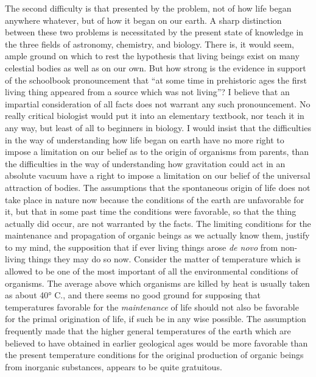 \documentclass[a4paper, 11pt, oneside, polutonikogreek, english, landscape]{article}
\begin{document}
The second difficulty is that presented by the problem, not of how life began anywhere whatever, but of how it began on our earth. A sharp distinction between these two problems is necessitated by the present state of knowledge in the three fields of astronomy, chemistry, and biology. There is, it would seem, ample ground on which to rest the hypothesis that living beings exist on many celestial bodies as well as on our own. But how strong is the evidence in support of the schoolbook pronouncement that ``at some time in prehistoric ages the first living thing appeared from a source which was not living''? I believe that an impartial consideration of all facts does not warrant any such pronouncement. No really critical biologist would put it into an elementary textbook, nor teach it in any way, but least of all to beginners in biology. I would insist that the difficulties in the way of understanding how life began on earth have no more right to impose a limitation on our belief as to the origin of organisms from parents, than the difficulties in the way of understanding how gravitation could act in an absolute vacuum have a right to impose a limitation on our belief of the universal attraction of bodies. The assumptions that the spontaneous origin of life does not take place in nature now because the conditions of the earth are unfavorable for it, but that in some past time the conditions were favorable, so that the thing actually did occur, are not warranted by the facts. The limiting conditions for the maintenance and propagation of organic beings as we actually know them, justify to my mind, the supposition that if ever living things arose \emph{de novo} from non-living things they may do so now. Consider the matter of temperature which is allowed to be one of the most important of all the environmental conditions of organisms. The average above which organisms are killed by heat is usually taken as about 40° C., and there seems no good ground for supposing that temperatures favorable for the \emph{maintenance} of life should not also be favorable for the primal origination of life, if such be in any wise possible. The assumption frequently made that the higher general temperatures of the earth which are believed to have obtained in earlier geological ages would be more favorable than the present temperature conditions for the original production of organic beings from inorganic substances, appears to be quite gratuitous.
\end{document}
